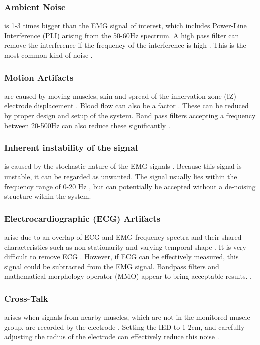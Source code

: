 \documentclass{article}
\begin{document}
\subsubsection{Ambient Noise} is 1-3 times bigger than the EMG signal of interest, which includes Power-Line Interference (PLI) arising from the 50-60Hz spectrum. A high pass filter can remove the interference if the frequency of the interference is high \cite{Nazmi2016}. This is the most common kind of noise \cite{Sulaiman2016}.
\subsubsection{Motion Artifacts} are caused by moving muscles, skin and spread of the innervation zone (IZ) electrode displacement \cite{Reaz2006} \cite{Chowdhury2013} \cite{Masuda1985}. Blood flow can also be a factor \cite{Luca2002a}. These can be reduced by proper design and setup of the system. Band pass filters accepting a frequency between 20-500Hz can also reduce these significantly \cite{Balbinot2013} \cite{El-Khoury2015}.
\subsubsection{Inherent instability of the signal} is caused by the stochastic nature of the EMG signals \cite{Chowdhury2013}. Because this signal is unstable, it can be regarded as unwanted. The signal usually lies within the frequency range of 0-20 Hz \cite{Nazmi2016}, but can potentially be accepted without a de-noising structure within the system. %
\subsubsection{Electrocardiographic (ECG) Artifacts} arise due to an overlap of ECG and EMG frequency spectra and their shared characteristics such as non-stationarity and varying temporal shape \cite{Reaz2006} \cite{Chowdhury2013}. It is very difficult to remove ECG \cite{Nazmi2016}. However, if ECG can be effectively measured, this signal could be subtracted from the EMG signal. Bandpass filters and mathematical morphology operator (MMO) appear to bring acceptable results. \cite{Abbaspour} \cite{Nazmi2016}.
\subsubsection{Cross-Talk} arises when signals from nearby muscles, which are not in the monitored muscle group, are recorded by the electrode \cite{Chowdhury2013}. Setting the IED to 1-2cm,  and carefully adjusting the radius of the electrode can effectively reduce this noise \cite{Nazmi2016}. 
\end{document}
